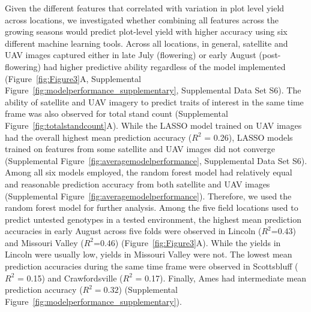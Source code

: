 \documentclass[12pt,twoside]{gsag3jnl}
\begin{document}

Given the different features that correlated with variation in plot level yield across locations, we investigated whether combining all features across the growing seasons would predict plot-level yield with higher accuracy using six different machine learning tools. Across all locations, in general, satellite and UAV images captured either in late July (flowering) or early August (post-flowering) had higher predictive ability regardless of the model implemented (Figure~\ref{fig:Figure3}A, Supplemental Figure~\ref{fig:modelperformance_supplementary}, Supplemental Data Set S6). The ability of satellite and UAV imagery to predict traits of interest in the same time frame was also observed for total stand count (Supplemental Figure~\ref{fig:totalstandcount}A). While the LASSO model trained on UAV images had the overall highest mean prediction accuracy ($R^2$ = 0.26), LASSO models trained on features from some satellite and UAV images did not converge (Supplemental Figure~\ref{fig:averagemodelperformance}, Supplemental Data Set S6). Among all six models employed, the random forest model had relatively equal and reasonable prediction accuracy from both satellite and UAV images (Supplemental Figure~\ref{fig:averagemodelperformance}). Therefore, we used the random forest model for further analysis. Among the five field locations used to predict untested genotypes in a tested environment, the highest mean prediction accuracies in early August across five folds were observed in Lincoln ($R^2$=0.43) and Missouri Valley ($R^2$=0.46) (Figure~\ref{fig:Figure3}A). While the yields in Lincoln were usually low, yields in Missouri Valley were not. The lowest mean prediction accuracies during the same time frame were observed in Scottsbluff ($R^2$ = 0.15) and Crawfordsville ($R^2$ = 0.17). Finally, Ames had intermediate mean prediction accuracy ($R^2=0.32$) (Supplemental Figure~\ref{fig:modelperformance_supplementary}).  
\end{document}
